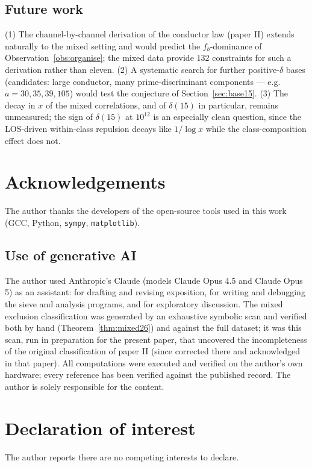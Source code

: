 \documentclass[11pt,reqno]{amsart}
\theoremstyle{plain}
\theoremstyle{definition}
\begin{document}
\subsection*{Future work}
(1) The channel-by-channel derivation of the conductor law (paper II)
extends naturally to the mixed setting and would predict the $f_b$-dominance
of Observation~\ref{obs:organise}; the mixed data provide $132$ constraints
for such a derivation rather than eleven. (2) A systematic search for further
positive-$\delta$ bases (candidates: large conductor, many prime-discriminant
components --- e.g.\ $a = 30, 35, 39, 105$) would test the conjecture of
Section~\ref{sec:base15}. (3) The decay in $x$ of the mixed correlations,
and of $\delta(15)$ in particular, remains unmeasured; the sign of
$\delta(15)$ at $10^{12}$ is an especially clean question, since the
LOS-driven within-class repulsion decays like $1/\log x$ while the
class-composition effect does not.

\section*{Acknowledgements}
The author thanks the developers of the open-source tools used in this work
(GCC, Python, \texttt{sympy}, \texttt{matplotlib}).

\subsection*{Use of generative AI}
The author used Anthropic's Claude (models Claude Opus 4.5 and Claude
Opus 5) as an assistant: for drafting and revising exposition, for writing
and debugging the sieve and analysis programs, and for exploratory
discussion. The mixed exclusion classification was generated by an
exhaustive symbolic scan and verified both by hand (Theorem~\ref{thm:mixed26})
and against the full dataset; it was this scan, run in preparation for the
present paper, that uncovered the incompleteness of the original
classification of paper II (since corrected there and acknowledged in that
paper). All computations were executed and verified on the author's own
hardware; every reference has been verified against the published record.
The author is solely responsible for the content.

\section*{Declaration of interest}
The author reports there are no competing interests to declare.
\end{document}
